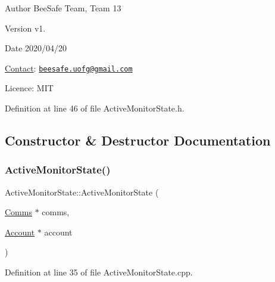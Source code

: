 \begin{DoxyAuthor}{Author}
Bee\+Safe Team, Team 13
\end{DoxyAuthor}
\begin{DoxyVersion}{Version}
v1.
\end{DoxyVersion}
\begin{DoxyDate}{Date}
2020/04/20
\end{DoxyDate}
\hyperlink{class_contact}{Contact}\+: \href{mailto:beesafe.uofg@gmail.com}{\tt beesafe.\+uofg@gmail.\+com}

Licence\+: M\+IT 

Definition at line 46 of file Active\+Monitor\+State.\+h.



\subsection{Constructor \& Destructor Documentation}
\mbox{\label{class_active_monitor_state_af1a0341307d63c900ccdc0a99fbe59e0}} 
\subsubsection{\texorpdfstring{Active\+Monitor\+State()}{ActiveMonitorState()}}
{\footnotesize\ttfamily Active\+Monitor\+State\+::\+Active\+Monitor\+State (\begin{DoxyParamCaption}\item[{\hyperlink{class_comms}{Comms} $\ast$}]{comms,  }\item[{\hyperlink{class_account}{Account} $\ast$}]{account }\end{DoxyParamCaption})}



Definition at line 35 of file Active\+Monitor\+State.\+cpp.



